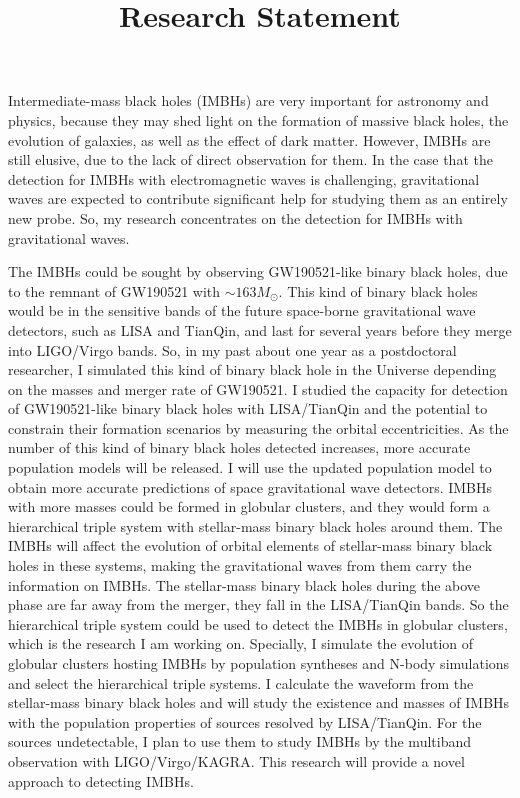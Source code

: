 \documentclass[12pt,a4paper,sans]{article}%
\title{\vspace{-2.5cm}\Huge Research Statement \vspace{-2.2em}}
\date{}
\begin{document}
\maketitle

Intermediate-mass black holes (IMBHs) are very important for astronomy and physics, because they may shed
light on the formation of massive black holes, the evolution of galaxies, as well as the effect of dark matter. However, IMBHs
are still elusive, due to the lack of direct observation for them. In the case that the detection for IMBHs with
electromagnetic waves is challenging, gravitational waves are expected to contribute significant help for studying them 
as an entirely new probe. So, my research concentrates on the detection for IMBHs with gravitational waves.

The IMBHs could be sought by observing GW190521-like binary black holes, due to the
remnant of GW190521 with $\sim163M_{\odot}$. This kind of binary black holes would be in the sensitive bands of the
future space-borne gravitational wave detectors, such as LISA and TianQin, and last for several years before they
merge into LIGO/Virgo bands. So, in my past about one year as a postdoctoral researcher, I simulated this kind of binary
black hole in the Universe depending on the masses and merger rate of GW190521. I studied the capacity for detection of GW190521-like
binary black holes with LISA/TianQin and the potential to constrain their formation scenarios by measuring the orbital
eccentricities. As the number of this kind of binary black holes detected increases, more accurate population models will
be released. I will use the updated population model to obtain more accurate predictions of space gravitational wave
detectors. IMBHs with more masses could be formed in globular
clusters, and they would form a hierarchical triple system with stellar-mass binary black holes around them. The IMBHs
will affect the evolution of orbital elements of stellar-mass binary black holes in these systems, making the
gravitational waves from them carry the information on IMBHs. The stellar-mass binary black holes during the above phase
are far away from the merger, they fall in the LISA/TianQin bands. So the hierarchical triple system could be used to
detect the IMBHs in globular clusters, which is the research I am working on. Specially, I simulate the evolution of
globular clusters hosting IMBHs by population syntheses and N-body simulations and select the hierarchical triple
systems. I calculate the waveform from the stellar-mass binary black holes and will study the existence and masses of
IMBHs with the population properties of sources resolved by LISA/TianQin. For the sources undetectable, I plan to use
them to study IMBHs by the multiband observation with LIGO/Virgo/KAGRA. This research will provide a novel approach to
detecting IMBHs.
\end{document}
